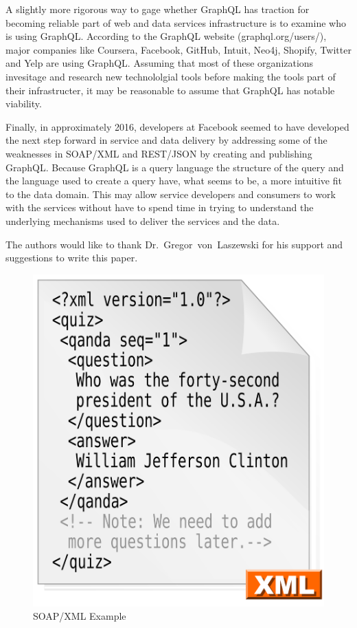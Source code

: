 A slightly more rigorous way to gage whether GraphQL has traction for becoming 
reliable part of web and data services infrastructure is to examine who is 
using GraphQL.  According to the GraphQL website (graphql.org/users/), major 
companies like Coursera, Facebook, GitHub, Intuit, Neo4j, Shopify, Twitter 
and Yelp are using GraphQL\cite{GraphQLUsers2018}.  Assuming that most of these 
organizations invesitage and research new technololgial tools before making the 
tools part of their infrastructer, it may be reasonable to assume that GraphQL 
has notable viability.

Finally, in approximately 2016, developers at Facebook seemed to have 
developed the next step forward in service and data delivery by addressing some 
of the weaknesses in SOAP/XML and REST/JSON by creating and publishing GraphQL.
Because GraphQL is a query language the structure of the query and the language 
used to create a query have, what seems to be, a more intuitive fit to the data 
domain.  This may allow service developers and consumers to work with the 
services without have to spend time in trying to understand the underlying 
mechanisms used to deliver the services and the data.

\begin{acks}

  The authors would like to thank Dr.~Gregor~von~Laszewski for his
  support and suggestions to write this paper.

\end{acks}


 

\begin{figure}[!ht]
  \centering\includegraphics[width=\columnwidth]{images/xml-example.png}
  \caption{SOAP/XML Example}\label{f:xml-example}
\end{figure}

